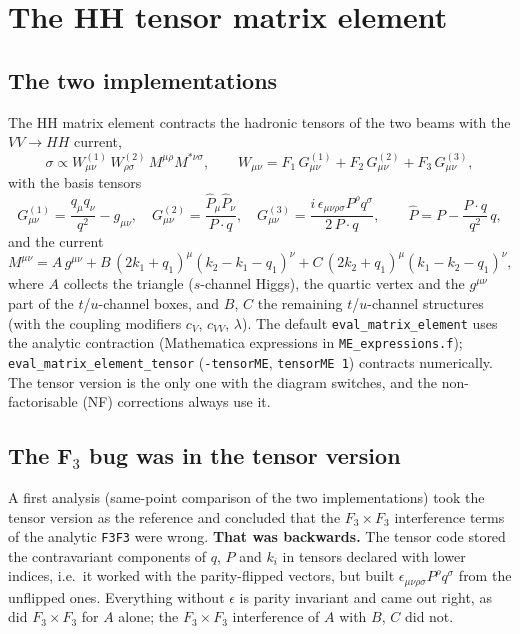\documentclass[11pt,a4paper]{article}
\newcommand{\file}[1]{\texttt{#1}}
\begin{document}
\section{The HH tensor matrix element}

\subsection{The two implementations}

The HH matrix element contracts the hadronic tensors of the two beams
with the $VV\to HH$ current,
\begin{equation}
  \sigma \propto W^{(1)}_{\mu\nu}\,W^{(2)}_{\rho\sigma}\,
  M^{\mu\rho}M^{*\nu\sigma},\qquad
  W_{\mu\nu} = F_1\,G^{(1)}_{\mu\nu} + F_2\,G^{(2)}_{\mu\nu} + F_3\,G^{(3)}_{\mu\nu},
\end{equation}
with the basis tensors
\begin{equation}
  G^{(1)}_{\mu\nu} = \frac{q_\mu q_\nu}{q^2} - g_{\mu\nu},\quad
  G^{(2)}_{\mu\nu} = \frac{\hat P_\mu \hat P_\nu}{P\cdot q},\quad
  G^{(3)}_{\mu\nu} = \frac{i\,\epsilon_{\mu\nu\rho\sigma}P^\rho q^\sigma}{2\,P\cdot q},\qquad
  \hat P = P - \frac{P\cdot q}{q^2}\,q,
\end{equation}
and the current
\begin{equation}
  M^{\mu\nu} = A\,g^{\mu\nu} + B\,(2k_1+q_1)^\mu(k_2-k_1-q_1)^\nu
             + C\,(2k_2+q_1)^\mu(k_1-k_2-q_1)^\nu ,
\end{equation}
where $A$ collects the triangle ($s$-channel Higgs), the quartic vertex
and the $g^{\mu\nu}$ part of the $t$/$u$-channel boxes, and $B$, $C$ the
remaining $t$/$u$-channel structures (with the coupling modifiers
$c_V$, $c_{VV}$, $\lambda$). The default \texttt{eval\_matrix\_element}
uses the analytic contraction (Mathematica expressions in
\file{ME\_expressions.f}); \texttt{eval\_matrix\_element\_tensor}
(\texttt{-tensorME}, \texttt{tensorME 1}) contracts numerically. The
tensor version is the only one with the diagram switches, and the
non-factorisable (NF) corrections always use it.

\subsection{\texorpdfstring{The F$_3$ bug was in the tensor version}{The F3 bug was in the tensor version}}

A first analysis (same-point comparison of the two implementations)
took the tensor version as the reference and concluded that the
$F_3\times F_3$ interference terms of the analytic \texttt{F3F3} were
wrong. \textbf{That was backwards.} The tensor code stored the
contravariant components of $q$, $P$ and $k_i$ in tensors declared with
lower indices, i.e.\ it worked with the parity-flipped vectors, but
built $\epsilon_{\mu\nu\rho\sigma}P^\rho q^\sigma$ from the unflipped
ones. Everything without $\epsilon$ is parity invariant and came out
right, as did $F_3\times F_3$ for $A$ alone; the $F_3\times F_3$
interference of $A$ with $B$, $C$ did not.
\end{document}
